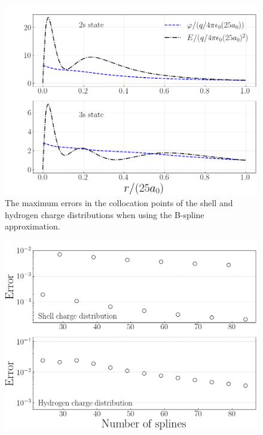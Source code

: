 \documentclass[twocolumn]{article}
\begin{document}
\begin{large}
\begin{figure}[b!]
    \label{17apr0959}
    \includegraphics[scale=0.35]{Hydrogen_23.png}
    \caption{The maximum errors in the collocation points of the shell and hydrogen charge distributions when using the B-spline approximation.}
    \label{18apr2008}
\end{figure}
\begin{figure}[b!]
    \includegraphics[scale=0.35]{Errors.png}
    \caption{}
    \label{17apr0946}
\end{figure}
















\end{large}
\end{document}
